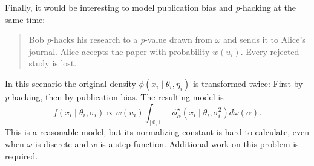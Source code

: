\documentclass[useAMS,usenatbib,referee]{biom}
\begin{document}
Finally, it would be interesting to model publication bias and \textit{p}-hacking at the same time:
\begin{quote}
Bob \textit{p}-hacks his research to a \textit{p}-value drawn from $\omega$ and sends it to Alice's journal. Alice accepts the paper with probability $w(u_i)$. Every rejected study is lost.
\end{quote}
In this scenario the original density $\phi(x_{i}\mid\theta_{i},\eta_{i})$ is transformed twice: First by \textit{p}-hacking, then by publication bias. The resulting model is
$$
f(x_{i}\mid\theta_{i},\sigma_{i})\propto w(u_i)\int_{[0,1]}\phi_{\alpha}^{\star}(x_{i}\mid\theta_{i},\sigma^2_{i})d\omega(\alpha).
$$
This is a reasonable model, but its normalizing constant is hard to calculate, even when $\omega$ is discrete and $w$ is a step function. Additional work on this problem is required.




\label{lastpage}
\end{document}
